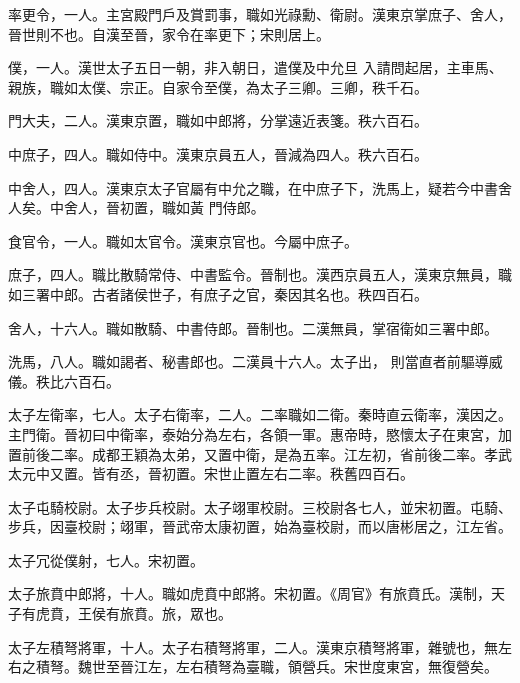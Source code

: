 \begin{pinyinscope}
 率更令，一人。主宮殿門戶及賞罰事，職如光祿勳、衛尉。漢東京掌庶子、舍人，晉世則不也。自漢至晉，家令在率更下；宋則居上。



 僕，一人。漢世太子五日一朝，非入朝日，遣僕及中允旦
 入請問起居，主車馬、親族，職如太僕、宗正。自家令至僕，為太子三卿。三卿，秩千石。



 門大夫，二人。漢東京置，職如中郎將，分掌遠近表箋。秩六百石。



 中庶子，四人。職如侍中。漢東京員五人，晉減為四人。秩六百石。



 中舍人，四人。漢東京太子官屬有中允之職，在中庶子下，洗馬上，疑若今中書舍人矣。中舍人，晉初置，職如黃
 門侍郎。



 食官令，一人。職如太官令。漢東京官也。今屬中庶子。



 庶子，四人。職比散騎常侍、中書監令。晉制也。漢西京員五人，漢東京無員，職如三署中郎。古者諸侯世子，有庶子之官，秦因其名也。秩四百石。



 舍人，十六人。職如散騎、中書侍郎。晉制也。二漢無員，掌宿衛如三署中郎。



 洗馬，八人。職如謁者、秘書郎也。二漢員十六人。太子出，
 則當直者前驅導威儀。秩比六百石。



 太子左衛率，七人。太子右衛率，二人。二率職如二衛。秦時直云衛率，漢因之。主門衛。晉初曰中衛率，泰始分為左右，各領一軍。惠帝時，愍懷太子在東宮，加置前後二率。成都王穎為太弟，又置中衛，是為五率。江左初，省前後二率。孝武太元中又置。皆有丞，晉初置。宋世止置左右二率。秩舊四百石。



 太子屯騎校尉。太子步兵校尉。太子翊軍校尉。三校尉各七人，並宋初置。屯騎、步兵，因臺校尉；翊軍，晉武帝太康初置，始為臺校尉，而以唐彬居之，江左省。



 太子冗從僕射，七人。宋初置。



 太子旅賁中郎將，十人。職如虎賁中郎將。宋初置。《周官》有旅賁氏。漢制，天子有虎賁，王侯有旅賁。旅，眾也。



 太子左積弩將軍，十人。太子右積弩將軍，二人。漢東京積弩將軍，雜號也，無左右之積弩。魏世至晉江左，左右積弩為臺職，領營兵。宋世度東宮，無復營矣。




\end{pinyinscope}
